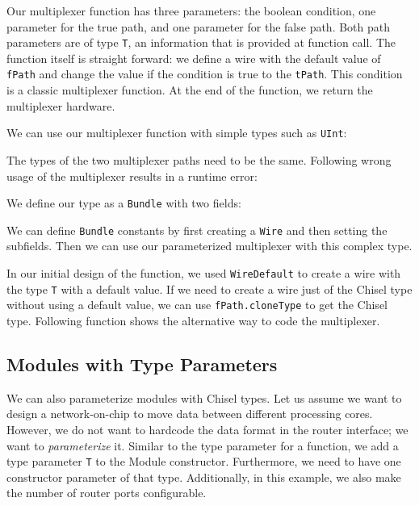 \documentclass[%
    10pt,
    headinclude, footexclude,
    openright, %
    notitlepage,
    cleardoubleempty,
    headsepline,
    pointlessnumbers,
    bibtotoc, idxtotoc,
    ]{scrbook}
\newcommand{\code}[1]{{\small{\texttt{#1}}}}
\begin{document}
Our multiplexer function has three parameters: the boolean condition,
one parameter for the true path, and one parameter for the false path.
Both path parameters are of type \code{T}, an information that is
provided at function call. The function itself is straight forward:
we define a wire with the default value of \code{fPath} and
change the value if the condition is true to the \code{tPath}.
This condition is a classic multiplexer function.
At the end of the function, we return the multiplexer hardware.

We can use our multiplexer function with simple types such as
\code{UInt}:


\noindent The types of the two multiplexer paths need to be the same.
Following wrong usage of the multiplexer results in a runtime error:


\noindent We define our type as a \code{Bundle} with two fields:


\noindent We can define \code{Bundle} constants by first creating
a \code{Wire} and then setting the subfields.
Then we can use our parameterized multiplexer with this complex type.


In our initial design of the function, we used \code{WireDefault}
to create a wire with the type \code{T} with a default value.
If we need to create a wire just of the Chisel type without using a default
value, we can use \code{fPath.cloneType} to get the Chisel type.
Following function shows the alternative way to code the multiplexer.


\subsection{Modules with Type Parameters}

We can also parameterize modules with Chisel types.
Let us assume we want to design a network-on-chip to move data between
different processing cores. However, we do not want to hardcode the
data format in the router interface; we want to \emph{parameterize} it.
Similar to the type parameter for a function, we add a type parameter \code{T}
to the Module constructor. Furthermore, we need to have one constructor
parameter of that type. Additionally, in this example, we also make the number
of router ports configurable.
\end{document}
